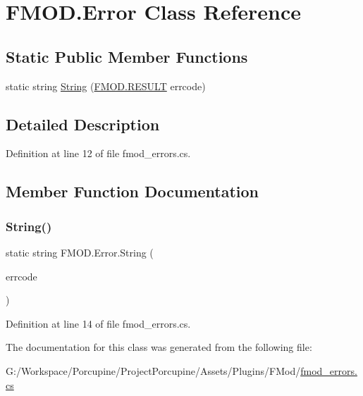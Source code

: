 \hypertarget{class_f_m_o_d_1_1_error}{}\section{F\+M\+O\+D.\+Error Class Reference}
\label{class_f_m_o_d_1_1_error}
\subsection*{Static Public Member Functions}
\begin{DoxyCompactItemize}
\item 
static string \hyperlink{class_f_m_o_d_1_1_error_aaf08aed6f877103189fe20a60dcc87ce}{String} (\hyperlink{namespace_f_m_o_d_a305d1176ef3f8c8815861a60407ac33d}{F\+M\+O\+D.\+R\+E\+S\+U\+LT} errcode)
\end{DoxyCompactItemize}


\subsection{Detailed Description}


Definition at line 12 of file fmod\+\_\+errors.\+cs.



\subsection{Member Function Documentation}
\mbox{\label{class_f_m_o_d_1_1_error_aaf08aed6f877103189fe20a60dcc87ce}} 
\subsubsection{\texorpdfstring{String()}{String()}}
{\footnotesize\ttfamily static string F\+M\+O\+D.\+Error.\+String (\begin{DoxyParamCaption}\item[{\hyperlink{namespace_f_m_o_d_a305d1176ef3f8c8815861a60407ac33d}{F\+M\+O\+D.\+R\+E\+S\+U\+LT}}]{errcode }\end{DoxyParamCaption})\hspace{0.3cm}{\ttfamily [static]}}



Definition at line 14 of file fmod\+\_\+errors.\+cs.



The documentation for this class was generated from the following file\+:\begin{DoxyCompactItemize}
\item 
G\+:/\+Workspace/\+Porcupine/\+Project\+Porcupine/\+Assets/\+Plugins/\+F\+Mod/\hyperlink{fmod__errors_8cs}{fmod\+\_\+errors.\+cs}\end{DoxyCompactItemize}
